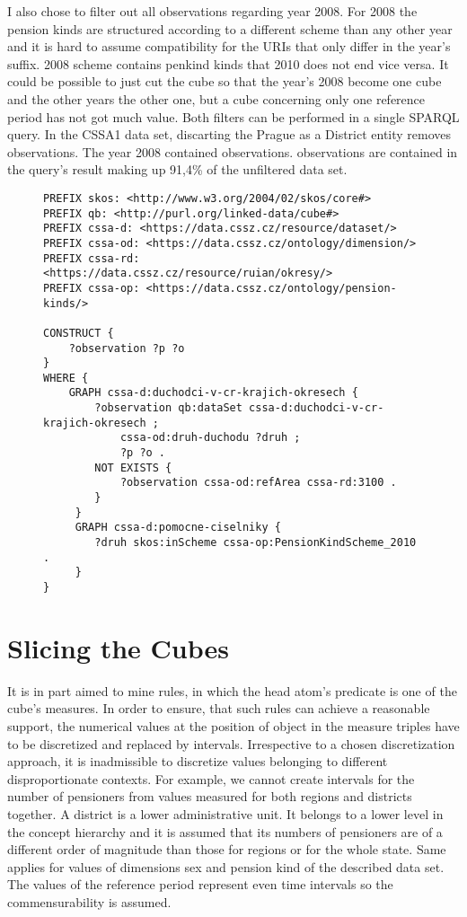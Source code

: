I also chose to filter out all observations regarding year 2008. For 2008 the pension kinds are structured according to a different scheme than any other year and it is hard to assume compatibility for the URIs that only differ in the year's suffix. 2008 scheme contains penkind kinds that 2010 does not end vice versa. It could be possible to just cut the cube so that the year's 2008 become one cube and the other years the other one, but a cube concerning only one reference period has not got much value. Both filters can be performed in a single SPARQL query. In the CSSA1 data set, discarting the Prague as a District entity removes  observations. The year 2008 contained  observations.  observations are contained in the query's result making up 91,4\% of the unfiltered data set.

\begin{figure}[h]
\begin{lstlisting}[language = SPARQL, caption={SPARQL query to filter the CSSA1 data set (Source: author)}, label={sparqlexample},captionpos=b escapeinside={(*@}{@*)}]
PREFIX skos: <http://www.w3.org/2004/02/skos/core#>
PREFIX qb: <http://purl.org/linked-data/cube#>
PREFIX cssa-d: <https://data.cssz.cz/resource/dataset/>
PREFIX cssa-od: <https://data.cssz.cz/ontology/dimension/>
PREFIX cssa-rd: <https://data.cssz.cz/resource/ruian/okresy/>
PREFIX cssa-op: <https://data.cssz.cz/ontology/pension-kinds/>

CONSTRUCT {
    ?observation ?p ?o
} 
WHERE {
    GRAPH cssa-d:duchodci-v-cr-krajich-okresech {
        ?observation qb:dataSet cssa-d:duchodci-v-cr-krajich-okresech ;
            cssa-od:druh-duchodu ?druh ;
            ?p ?o .
        NOT EXISTS {
            ?observation cssa-od:refArea cssa-rd:3100 .
        }
     }
     GRAPH cssa-d:pomocne-ciselniky {
        ?druh skos:inScheme cssa-op:PensionKindScheme_2010 .
     }
}
\end{lstlisting}
\end{figure}

\section{Slicing the Cubes\label{cssaSlicing}}

It is in part aimed to mine rules, in which the head atom's predicate is one of the cube's measures. In order to ensure, that such rules can achieve a reasonable support, the numerical values at the position of object in the measure triples have to be discretized and replaced by intervals. Irrespective to a chosen discretization approach, it is inadmissible to discretize values belonging to different disproportionate contexts. For example, we cannot create intervals for the number of pensioners from values measured for both regions and districts together. A district is a lower administrative unit. It belongs to a lower level in the concept hierarchy and it is assumed that its numbers of pensioners are of a different order of magnitude than those for regions or for the whole state. Same applies for values of dimensions sex and pension kind of the described data set. The values of the reference period represent even time intervals so the commensurability is assumed.

